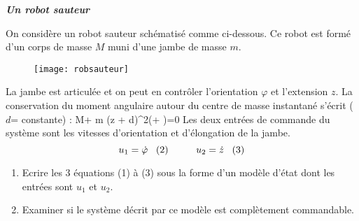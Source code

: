 \vspace*{2mm}
\begin{exercice}{\bf \em Un robot sauteur}


On considère un \og robot sauteur \fg \; schématisé comme ci-dessous.
Ce robot est formé d'un corps de masse $M$ muni d'une jambe de
masse $m$.  
\begin{figure}[h]
\begin{center}
\texttt{[image: robsauteur]}
\end{center}
\end{figure}

\noindent La jambe est articulée et on peut en contr\^oler
l'orientation $\varphi$ et l'extension
$z$.
La conservation du moment angulaire autour du centre de masse instantané
s'écrit ($d$= constante) :
\eqnn
M\dot \theta + m (z + d)^2(\dot\theta + \dot \varphi)=0
\eeqnn
Les deux entrées de commande du système sont les vitesses d'orientation et
d'élongation de la jambe.
$$
u_1 = \dot \varphi \;\;\; (2) \hspace*{1cm} u_2 = \dot z \;\;\; (3)
$$
\begin{enumerate}
\item Ecrire les 3 équations (1) à (3) sous la forme d'un modèle d'état
dont les entrées sont $u_1$ et $u_2$.
\item Examiner si le système décrit par ce modèle est complètement
commandable.
\end{enumerate}

\end{exercice}

